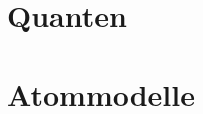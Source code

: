 \documentclass[9pt, twopage]{book}
\begin{document}
\chapter{Quanten} \label{ch:Quanten}


\chapter{Atommodelle} \label{ch:Atommodelle}



%	
\end{document}

